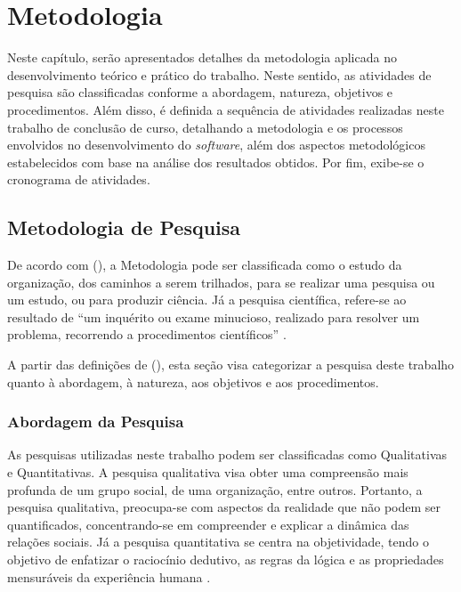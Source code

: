 \chapter[Metodologia]{Metodologia}

Neste capítulo, serão apresentados detalhes da metodologia aplicada no desenvolvimento teórico e prático do trabalho. Neste sentido, as atividades de pesquisa são classificadas conforme a abordagem, natureza, objetivos e procedimentos. Além disso, é definida a sequência de atividades realizadas neste trabalho de conclusão de curso, detalhando a metodologia e os processos envolvidos no desenvolvimento do \textit{software}, além dos aspectos metodológicos estabelecidos com base na análise dos resultados obtidos. Por fim, exibe-se o cronograma de atividades. 

\section{Metodologia de Pesquisa}
\label{sec:met_pesquisa}
De acordo com  (\citeyear{gerhardt2009metodos}), a Metodologia pode ser classificada como o estudo da organização, dos caminhos a serem trilhados, para se realizar uma pesquisa ou um estudo, ou para produzir ciência. Já a pesquisa científica, refere-se ao resultado de “um inquérito ou exame minucioso, realizado para resolver um problema, recorrendo a procedimentos científicos” \cite{gerhardt2009metodos}.

A partir das definições de  (\citeyear{gerhardt2009metodos}), esta seção visa categorizar a pesquisa deste trabalho quanto à abordagem, à natureza, aos objetivos e aos procedimentos.

\subsection{Abordagem da Pesquisa}
As pesquisas utilizadas neste trabalho podem ser classificadas como Qualitativas e Quantitativas. A pesquisa qualitativa visa obter uma compreensão mais profunda de um grupo social, de uma organização, entre outros. Portanto, a pesquisa qualitativa, preocupa-se com aspectos da realidade que não podem ser quantificados, concentrando-se em compreender e explicar a dinâmica das relações sociais. Já a pesquisa quantitativa se centra na objetividade, tendo o objetivo de enfatizar o raciocínio dedutivo, as regras da lógica e as propriedades mensuráveis da experiência humana \cite{gerhardt2009metodos}.

